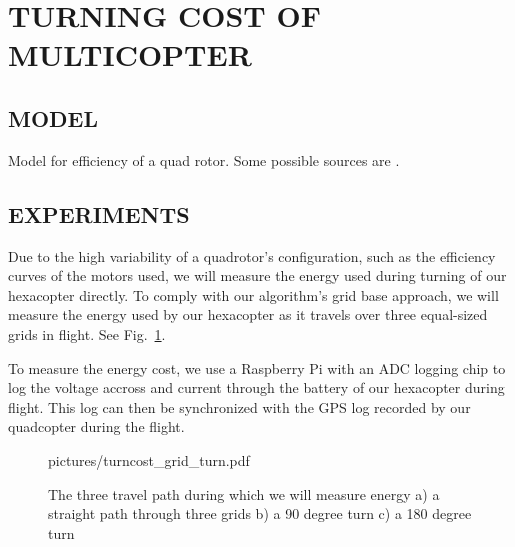 \section {TURNING COST OF MULTICOPTER}

\subsection{MODEL}

Model for efficiency of a quad rotor. Some possible sources are \cite{driessens2013}.


\subsection{EXPERIMENTS}

Due to the high variability of a quadrotor's configuration, such as the efficiency curves of the motors used, we will measure the energy used during turning of our hexacopter directly.
To comply with our algorithm's grid base approach, we will measure the energy used by our hexacopter as it travels over three equal-sized grids in flight. See Fig.~\ref{fig:gridturn}.

To measure the energy cost, we use a Raspberry Pi with an ADC logging chip to log the voltage accross and current through the battery of our hexacopter during flight.
This log can then be synchronized with the GPS log recorded by our quadcopter during the flight.

\begin{figure}
	\centering
	\begin{overpic}[width=0.9\columnwidth]{pictures/turncost_grid_turn.pdf}
	\end{overpic}
	\caption{\label{fig:gridturn}
		The three travel path during which we will measure energy
		a) a straight path through three grids
		b) a 90 degree turn
		c) a 180 degree turn
	}
\end{figure}

